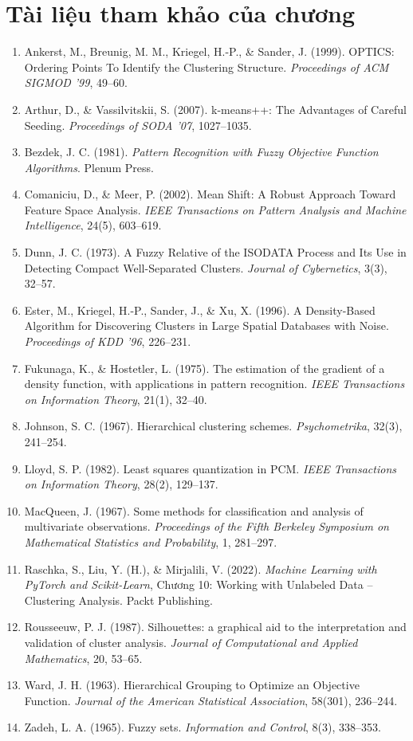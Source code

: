 \section*{Tài liệu tham khảo của chương}
\begin{enumerate}
    \item Ankerst, M., Breunig, M. M., Kriegel, H.-P., \& Sander, J. (1999). OPTICS: Ordering Points To Identify the Clustering Structure. \textit{Proceedings of ACM SIGMOD '99}, 49--60.
    \item Arthur, D., \& Vassilvitskii, S. (2007). k-means++: The Advantages of Careful Seeding. \textit{Proceedings of SODA '07}, 1027--1035.
    \item Bezdek, J. C. (1981). \textit{Pattern Recognition with Fuzzy Objective Function Algorithms}. Plenum Press.
    \item Comaniciu, D., \& Meer, P. (2002). Mean Shift: A Robust Approach Toward Feature Space Analysis. \textit{IEEE Transactions on Pattern Analysis and Machine Intelligence}, 24(5), 603--619.
    \item Dunn, J. C. (1973). A Fuzzy Relative of the ISODATA Process and Its Use in Detecting Compact Well-Separated Clusters. \textit{Journal of Cybernetics}, 3(3), 32--57.
    \item Ester, M., Kriegel, H.-P., Sander, J., \& Xu, X. (1996). A Density-Based Algorithm for Discovering Clusters in Large Spatial Databases with Noise. \textit{Proceedings of KDD '96}, 226--231.
    \item Fukunaga, K., \& Hostetler, L. (1975). The estimation of the gradient of a density function, with applications in pattern recognition. \textit{IEEE Transactions on Information Theory}, 21(1), 32--40.
    \item Johnson, S. C. (1967). Hierarchical clustering schemes. \textit{Psychometrika}, 32(3), 241--254.
    \item Lloyd, S. P. (1982). Least squares quantization in PCM. \textit{IEEE Transactions on Information Theory}, 28(2), 129--137.
    \item MacQueen, J. (1967). Some methods for classification and analysis of multivariate observations. \textit{Proceedings of the Fifth Berkeley Symposium on Mathematical Statistics and Probability}, 1, 281--297.
    \item Raschka, S., Liu, Y. (H.), \& Mirjalili, V. (2022). \textit{Machine Learning with PyTorch and Scikit-Learn}, Chương 10: Working with Unlabeled Data -- Clustering Analysis. Packt Publishing.
    \item Rousseeuw, P. J. (1987). Silhouettes: a graphical aid to the interpretation and validation of cluster analysis. \textit{Journal of Computational and Applied Mathematics}, 20, 53--65.
    \item Ward, J. H. (1963). Hierarchical Grouping to Optimize an Objective Function. \textit{Journal of the American Statistical Association}, 58(301), 236--244.
    \item Zadeh, L. A. (1965). Fuzzy sets. \textit{Information and Control}, 8(3), 338--353.
\end{enumerate}
